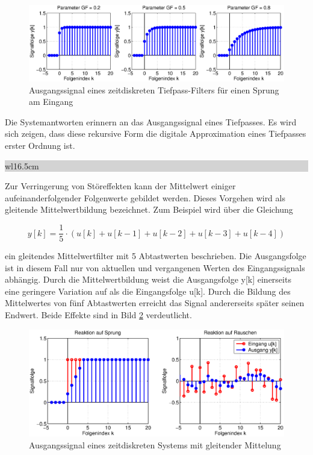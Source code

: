 \begin{figure}[H]
  \centerline{\includegraphics[width=1\textwidth]{Kapitel4/Bilder/image1.eps}}
  \caption{Ausgangssignal eines zeitdiskreten Tiefpass-Filters f\"{u}r einen Sprung am Eingang}
  \label{fig:RekursivTiefpass}
\end{figure}

\noindent Die Systemantworten erinnern an das Ausgangssignal eines Tiefpasses. Es wird sich zeigen, dass diese rekursive Form die digitale Approximation eines Tiefpasses erster Ordnung ist. \bigskip

\noindent
\colorbox{lightgray}{%
%
\renewcommand\arraystretch{0.6}%
\begin{tabular}{ wl{16.5cm} }
{\selectfont{Beispiel: Gleitender Mittelwert}}
\end{tabular}%
}\medskip

\noindent Zur Verringerung von St\"{o}reffekten kann der Mittelwert einiger aufeinanderfolgender Folgenwerte gebildet werden. Dieses Vorgehen wird als gleitende Mittelwertbildung bezeichnet. Zum Beispiel wird \"{u}ber die Gleichung

\begin{equation}\label{eq:fourtwo}
y\left[k\right]=\frac{1}{5} \cdot \left(u\left[k\right]+u\left[k-1\right]+u\left[k-2\right]+u\left[k-3\right]+u\left[k-4\right]\right)  
\end{equation}

\noindent ein gleitendes Mittelwertfilter mit 5 Abtastwerten beschrieben. Die Ausgangsfolge ist in diesem Fall nur von aktuellen und vergangenen Werten des Eingangssignals abh\"{a}ngig. Durch die Mittelwertbildung weist die Ausgangsfolge y[k] einerseits eine geringere Variation auf als die Eingangsfolge u[k]. Durch die Bildung des Mittelwertes von f\"{u}nf Abtastwerten erreicht das Signal andererseits sp\"{a}ter seinen Endwert. Beide Effekte sind in Bild \ref{fig:GleitenderMittelwert} verdeutlicht.

\begin{figure}[H]
  \centerline{\includegraphics[width=1\textwidth]{Kapitel4/Bilder/image2.eps}}
  \caption{Ausgangssignal eines zeitdiskreten Systems mit gleitender Mittelung}
  \label{fig:GleitenderMittelwert}
\end{figure}

